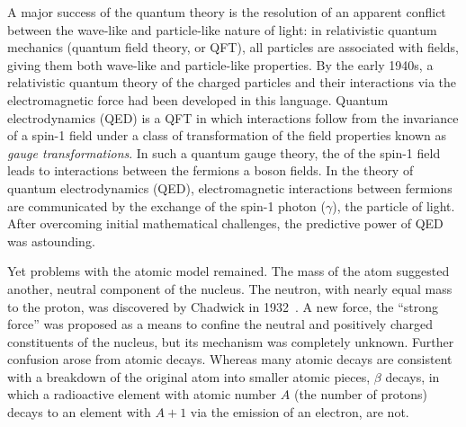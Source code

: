A major success of the quantum theory is the resolution of an apparent
conflict between the wave-like and particle-like nature of light:
in relativistic quantum mechanics (quantum field theory, or QFT), all particles are associated with fields, giving
them both wave-like and particle-like properties. 
By the early 1940s, a relativistic quantum theory of the charged particles
and their interactions via the electromagnetic force had been developed in 
this language. 
Quantum electrodynamics (QED) is a QFT in which interactions 
follow from the invariance of a spin-1 field under a class of transformation of the field properties
known as \emph{gauge transformations}.
In such a quantum gauge theory, the  of the spin-1 field leads to interactions between the fermions
a boson fields.
In the theory of quantum electrodynamics (QED),
electromagnetic interactions 
between fermions are communicated by the 
exchange of the spin-1 photon ($\gamma$),
the particle of light. After overcoming initial mathematical challenges, 
the predictive power of QED was astounding.

Yet problems with the atomic model remained. The mass of the atom
suggested another, neutral component of the nucleus. 
The neutron, with nearly equal mass to the proton, was
discovered by Chadwick in 1932~\cite{Chadwick:1932ma,doi:10.1098/rspa.1933.0152}. A new force, the ``strong force'' was proposed as
a means to 
confine the neutral and positively charged constituents of the nucleus,
but its mechanism was completely unknown.
Further confusion arose from atomic decays. Whereas many atomic
decays are consistent with a breakdown of the original atom into 
smaller atomic pieces, $\beta$ decays,
in which a radioactive element with atomic number $A$ 
(the number of protons) decays to an element with $A+1$
via the emission of an electron, are not. 

